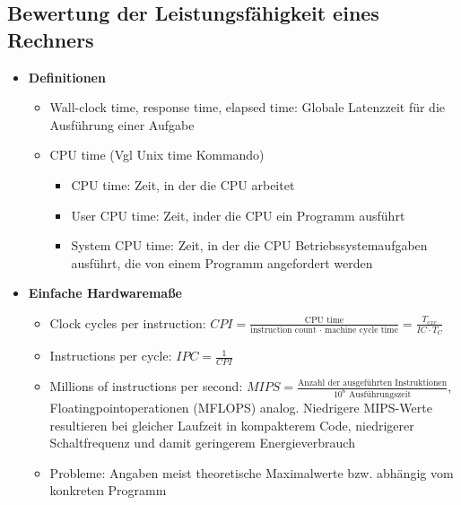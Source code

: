 \subsection{Bewertung der Leistungsfähigkeit eines Rechners}
\begin{itemize}
	\item \textbf{Definitionen}
	\begin{itemize}
		\item Wall-clock time, response time, elapsed time: Globale Latenzzeit für die Ausführung einer Aufgabe
		\item CPU time (Vgl Unix time Kommando)
		\begin{itemize}
			\item CPU time: Zeit, in der die CPU arbeitet
			\item User CPU time: Zeit, inder die CPU ein Programm ausführt
			\item System CPU time: Zeit, in der die CPU Betriebssystemaufgaben ausführt, die von einem Programm angefordert werden
		\end{itemize}
	\end{itemize}
	\item \textbf{Einfache Hardwaremaße}
	\begin{itemize}
		\item Clock cycles per instruction: \(CPI = \frac{\text{CPU time}}{\text{instruction count } \cdot \text{ machine cycle time}} = \frac{T_{exe}}{IC \cdot T_C}\)
		\item Instructions per cycle: \(IPC = \frac{1}{CPI}\)
		\item Millions of instructions per second: \(MIPS = \frac{\text{Anzahl der ausgeführten Instruktionen}}{10^6 \text{ Ausführungszeit}}\), Floatingpointoperationen (MFLOPS) analog. Niedrigere MIPS-Werte resultieren bei gleicher Laufzeit in kompakterem Code, niedrigerer Schaltfrequenz und damit geringerem Energieverbrauch
		\item Probleme: Angaben meist theoretische Maximalwerte bzw. abhängig vom konkreten Programm 
	\end{itemize}
\end{itemize}

